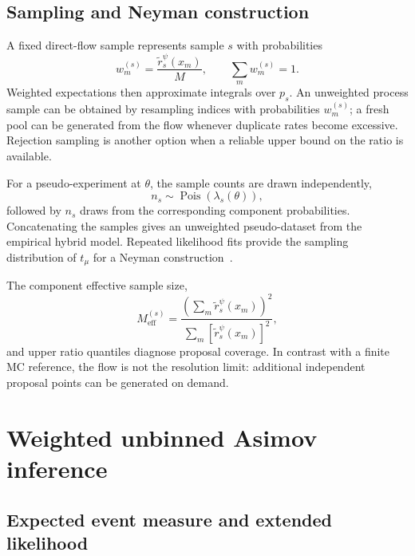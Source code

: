 \documentclass[
  aps,
  prd,
  superscriptaddress,
  nofootinbib,
  longbibliography,
  12pt
]{revtex4-2}
\newcommand{\Pois}{\operatorname{Pois}}
\begin{document}
\subsection{Sampling and Neyman construction}
\label{sec:sampling}

A fixed direct-flow sample represents sample $s$ with probabilities
\begin{equation}
  w_m^{(s)}=\frac{\widetilde r_s^\psi(x_m)}{M},
  \qquad \sum_mw_m^{(s)}=1.
  \label{eq:component-weights}
\end{equation}
Weighted expectations then approximate integrals over $p_s$.  An unweighted process sample can be obtained by resampling indices with probabilities $w_m^{(s)}$; a fresh pool can be generated from the flow whenever duplicate rates become excessive.  Rejection sampling is another option when a reliable upper bound on the ratio is available.

For a pseudo-experiment at $\theta$, the sample counts are drawn independently,
\begin{equation}
  n_s\sim\Pois\!\left(\lambda_s(\theta)\right),
\end{equation}
followed by $n_s$ draws from the corresponding component probabilities.  Concatenating the samples gives an unweighted pseudo-dataset from the empirical hybrid model.  Repeated likelihood fits provide the sampling distribution of $t_\mu$ for a Neyman construction~\cite{Neyman:1937}.

The component effective sample size,
\begin{equation}
  M_{\mathrm{eff}}^{(s)}
  =\frac{\left(\sum_m\widetilde r_s^\psi(x_m)\right)^2}
  {\sum_m\left[\widetilde r_s^\psi(x_m)\right]^2},
  \label{eq:ess}
\end{equation}
and upper ratio quantiles diagnose proposal coverage.  In contrast with a finite MC reference, the flow is not the resolution limit: additional independent proposal points can be generated on demand.

\section{Weighted unbinned Asimov inference}
\label{sec:asimov}

\subsection{Expected event measure and extended likelihood}
\end{document}
